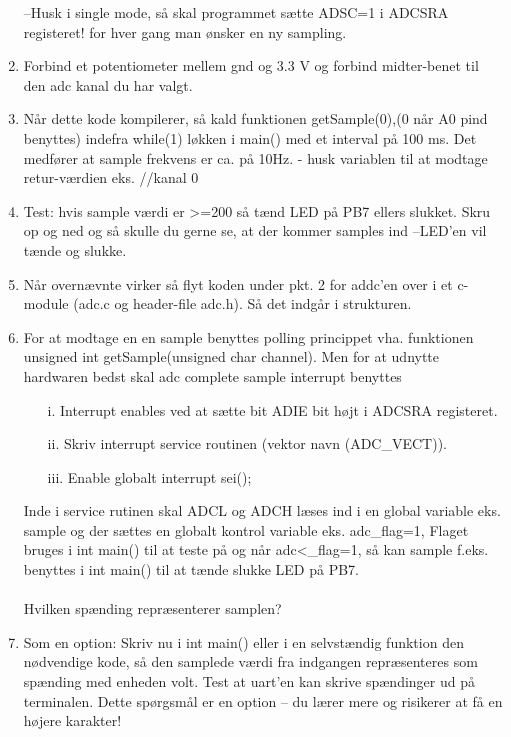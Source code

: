 \documentclass[a4paper,11pt]{article}
\theoremstyle{mytheor}
\begin{document}
\begin{enumerate}
\begin{center}
\end{center}
\par –Husk i single mode, så skal programmet sætte ADSC=1 i ADCSRA registeret! for hver gang man ønsker en ny sampling.
\item Forbind et potentiometer mellem gnd og 3.3 V og forbind midter-benet til den adc kanal du har valgt.
\item Når dette kode kompilerer, så kald funktionen getSample(0),(0 når A0 pind benyttes) indefra while(1) løkken i main() med et interval på 100 ms. Det medfører at sample frekvens er ca. på 10Hz. - husk variablen til at modtage retur-værdien eks. \color{blue}{ unsigned int sample= getSample(0);}\color{black} //kanal 0 
\item Test:  hvis sample værdi er >=200 så tænd LED på PB7 ellers slukket. 
Skru op og ned og så skulle du gerne se, at der kommer samples ind –LED’en vil tænde og slukke.
\item	Når overnævnte virker så flyt koden under pkt. 2 for addc’en over i et c-module (adc.c og header-file adc.h). Så det indgår i strukturen.
\item  For at modtage en en sample benyttes polling princippet vha. funktionen unsigned int getSample(unsigned char channel). Men for at udnytte hardwaren bedst skal adc complete sample interrupt benyttes
 \begin{enumerate}
\item[i.]Interrupt enables ved at sætte bit ADIE bit højt i ADCSRA registeret. 

\item[ii.]	Skriv interrupt service routinen (vektor navn (ADC\_VECT)). 

\item[iii.] Enable globalt interrupt sei(); 

 \end{enumerate}
 Inde i service rutinen skal ADCL og ADCH læses ind i en global variable eks. sample og der sættes en globalt kontrol variable eks. adc\_flag=1, Flaget bruges i int main() til at teste på og når adc<\_flag=1, så kan sample f.eks.  benyttes i int main() til at tænde slukke LED på PB7.
 
 \paragraph{}Hvilken spænding repræsenterer samplen?

\item Som en option: Skriv nu i int main() eller i en selvstændig funktion den nødvendige kode, så den samplede værdi fra indgangen repræsenteres som spænding med enheden volt. Test at uart’en kan skrive spændinger ud på terminalen. Dette spørgsmål er en option – du lærer mere og risikerer at få en højere karakter! 


\end{enumerate}
\end{document}
